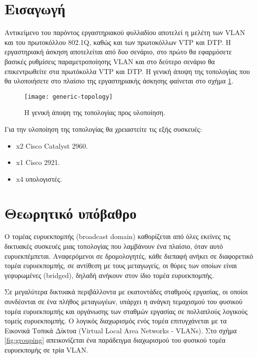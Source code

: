 \documentclass{EdipyLabs} %
\begin{document}
\Initialize

\section*{Εισαγωγή}
Αντικείμενο του παρόντος εργαστηριακού φυλλαδίου αποτελεί η μελέτη των VLAN και του πρωτοκόλλου 802.1Q, καθώς και των πρωτοκόλλων VTP και DTP. H εργαστηριακή άσκηση αποτελείται από δυο σενάριο, στο πρώτο θα εφαρμόσετε βασικές ρυθμίσεις παραμετροποίησης VLAN και στο δεύτερο σενάριο θα επικεντρωθείτε στα πρωτόκολλα VTP και DTP. Η γενική άποψη της τοπολογίας που θα υλοποιήσετε στο πλαίσιο της εργαστηριακής άσκησης φαίνεται στο σχήμα \ref{fig:generic}.

\begin{figure}[ht]
	\centering
	\texttt{[image: generic-topology]}
	\caption{Η γενική άποψη της τοπολογίας προς υλοποίηση.}\label{fig:generic}
\end{figure}

Για την υλοποίηση της τοπολογίας θα χρειαστείτε τις εξής συσκευές:
\begin{itemize}
	\item x2 Cisco Catalyst 2960.
	\item x1 Cisco 2921.
	\item x4 υπολογιστές.
\end{itemize}

\section{Θεωρητικό υπόβαθρο}

Ο τομέας ευρυεκπομπής (broadcast domain) καθορίζεται από όλες εκείνες τις δικτυακές συσκευές μιας τοπολογίας που λαμβάνουν ένα πλαίσιο, όταν αυτό ευρυεκπέμπεται. Αναφερόμενοι σε δρομολογητές, κάθε διεπαφή ανήκει σε διαφορετικό τομέα ευρυεκπομπής, σε αντίθεση με τους μεταγωγείς, οι θύρες των οποίων είναι γεφυρωμένες (bridged), δηλαδή ανήκουν στον ίδιο τομέα ευρυεκπομπής.

Σε μεγαλύτερα δικτυακά περιβάλλοντα με εκατοντάδες σταθμούς εργασίας, οι οποίοι συνδέονται σε ένα πλήθος μεταγωγέων, υπάρχει η ανάγκη τεμαχισμού του φυσικού τομέα ευρυεκπομπής και οργάνωσης των σταθμών εργασίας σε πολλαπλούς λογικούς τομείς ευρυεκπομπής. O λογικός διαχωρισμός ενός τομέα επιτυγχάνεται με τα Εικονικά Τοπικά Δίκτυα (Virtual Local Area Networks - VLANs). Στο σχήμα \ref{fig:grouping} απεικονίζεται ένα παράδειγμα διαχωρισμού του φυσικού τομέα ευρυεκπομής σε τρία VLAN. 
\end{document}

